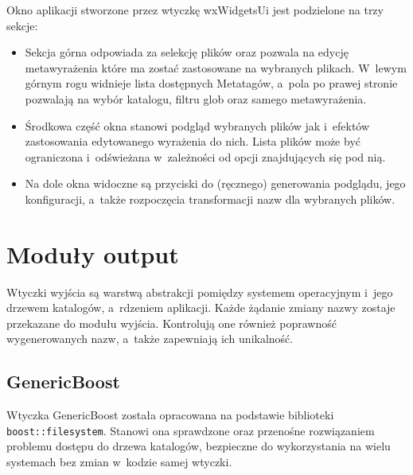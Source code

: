 Okno aplikacji stworzone przez wtyczkę wxWidgetsUi jest podzielone na trzy sekcje:
\begin{itemize}
\item Sekcja górna odpowiada za selekcję plików oraz pozwala na edycję metawyrażenia które ma zostać zastosowane na wybranych plikach.
 W~lewym górnym rogu widnieje lista dostępnych Metatagów, a~pola po prawej stronie pozwalają na wybór katalogu, filtru glob oraz samego metawyrażenia.

\item Środkowa część okna stanowi podgląd wybranych plików jak i~efektów zastosowania edytowanego wyrażenia do nich. Lista plików może być ograniczona i~odświeżana w~zależności od opcji znajdujących się pod nią.

\item Na dole okna widoczne są przyciski do (ręcznego) generowania podglądu, jego konfiguracji, a~także rozpoczęcia transformacji nazw dla wybranych plików.
\end{itemize}


\section{Moduły output}
\par
Wtyczki wyjścia są warstwą abstrakcji pomiędzy systemem operacyjnym i~jego drzewem katalogów, a~rdzeniem aplikacji.
Każde żądanie zmiany nazwy zostaje przekazane do modułu wyjścia.
Kontrolują one również poprawność wygenerowanych nazw, a~także zapewniają ich unikalność.

\subsection{GenericBoost}
Wtyczka GenericBoost została opracowana na podstawie biblioteki \texttt{boost::filesystem}. Stanowi ona sprawdzone oraz przenośne rozwiązaniem problemu dostępu do drzewa katalogów, bezpieczne do wykorzystania na wielu systemach bez zmian w~kodzie samej wtyczki.


